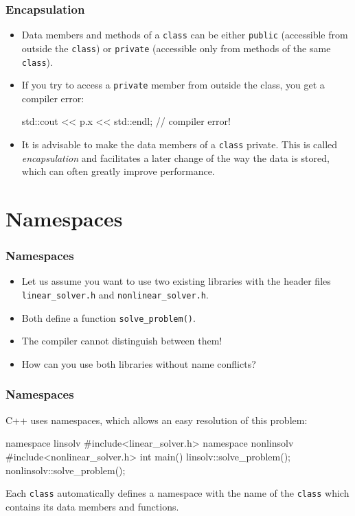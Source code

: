 \documentclass[aspectratio=169,ignorenonframetext,11pt]{beamer}
\def\inline{\lstinline[basicstyle=\small\ttfamily]}
\begin{document}
\begin{frame}[fragile]
  \frametitle{Encapsulation}
  \begin{itemize}
  \item Data members and methods of a \inline!class! can be either \inline!public! (accessible from outside the \inline!class!) or \inline!private! (accessible only from methods of the same \inline!class!).
  \item If you try to access a \inline!private! member from outside the class, you get a compiler error:
    \begin{cppcode}
      std::cout << p.x << std::endl; // compiler error!
    \end{cppcode}
  \item It is advisable to make the data members of a \inline!class! private. This is called \emph{encapsulation} and facilitates a later change of the way the data is stored, which can often greatly improve performance. 
  \end{itemize}
\end{frame}

\section{Namespaces}

\begin{frame}[fragile]
  \frametitle<presentation>{Namespaces}
  \begin{itemize}
  \item Let us assume you want to use two existing libraries with the header files \inline!linear_solver.h! and \inline!nonlinear_solver.h!. 
  \item Both define a function \inline!solve_problem()!. 
  \item The compiler cannot distinguish between them!
  \item How can you use both libraries without name conflicts? 
  \end{itemize}
  
\end{frame}

\begin{frame}[fragile]
  \frametitle<presentation> {Namespaces}
  C++ uses namespaces, which allows an easy resolution of this problem:
\begin{cppcode}
namespace linsolv {
  #include<linear_solver.h>
}
namespace nonlinsolv {
  #include<nonlinear_solver.h>
}
int main() {
  linsolv::solve_problem();
  nonlinsolv::solve_problem();
}
\end{cppcode}
Each \inline!class! automatically defines a namespace with the name of the \inline!class! which contains its data members and functions.
\end{frame}
\end{document}
